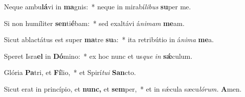 \item Neque ambu\textbf{lá}vi in \textbf{ma}gnis:~* neque in mirabí\tinyhspace\textit{libus} \textbf{su}per me.
\item Si non humíliter \textbf{sen}ti\textbf{é}bam:~* sed exaltávi á\tinyhspace\textit{nimam} \textbf{me}am.
\item Sicut ablactátus est super \textbf{ma}tre \textbf{su}a:~* ita retribútio in á\tinyhspace\textit{nima} \textbf{me}a.
\item Speret Isra\textbf{el} in \textbf{Dó}mino:~* ex hoc nunc et us\tinyhspace\textit{que} \textit{in} \textbf{sǽ}culum.
\item Glória \textbf{Pa}tri, et \textbf{Fí}lio,~* et Spirí\tinyhspace\textit{tui} \textbf{San}cto.
\item Sicut erat in princípio, et \textbf{nunc,} et \textbf{sem}per,~* et in sǽcula sæcu\tinyhspace\textit{lórum.} \textbf{A}men.
